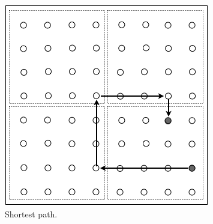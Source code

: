 \begin{itemize}
\begin{figure}[hbt]
\begin{center}
       \includegraphics[scale=0.5]{FiguresGraph/routingCity3}
       \caption{Shortest path.}
\end{center}
\end{figure}

\end{itemize}



